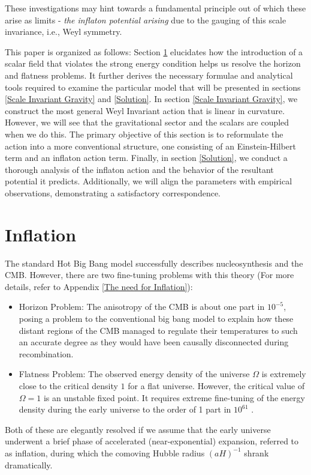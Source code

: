 \documentclass[aps,prd,reprint,preprintnumbers,showpacs,floatfix,nofootinbib,superscript address]{revtex4-2}
\begin{document}
These investigations may hint towards a fundamental principle out of which these arise as limits - \textit{the inflaton potential arising} due to the gauging of this scale invariance, i.e., Weyl symmetry.

This paper is organized as follows: Section \ref{Inflation} elucidates how the introduction of a scalar field that violates the strong energy condition helps us resolve the horizon and flatness problems. It further derives the necessary formulae and analytical tools required to examine the particular model that will be presented in sections \ref{Scale Invariant Gravity} and \ref{Solution}. In section \ref{Scale Invariant Gravity}, we construct the most general Weyl Invariant action that is linear in curvature. However, we will see that the gravitational sector and the scalars are coupled when we do this. The primary objective of this section is to reformulate the action into a more conventional structure, one consisting of an Einstein-Hilbert term and an inflaton action term. Finally, in section \ref{Solution}, we conduct a thorough analysis of the inflaton action and the behavior of the resultant potential it predicts. Additionally, we will align the parameters with empirical observations, demonstrating a satisfactory correspondence.

\section{Inflation}\label{Inflation}
The standard Hot Big Bang model successfully describes nucleosynthesis and the CMB. However, there are two fine-tuning problems with this theory (For more details, refer to Appendix \ref{The need for Inflation}): 
\begin{itemize}
    \item Horizon Problem: The anisotropy of the CMB is about one part in $10^{-5}$, posing a problem to the conventional big bang model to explain how these distant regions of the CMB managed to regulate their temperatures to such an accurate degree as they would have been causally disconnected during recombination.
    \item Flatness Problem: The observed energy density of the universe $\Omega$ is extremely close to the critical density $1$ for a flat universe. However, the critical value of $\Omega = 1$ is an unstable fixed point. It requires extreme fine-tuning of the energy density during the early universe to the order of 1 part in $10^{61}$ \cite{baumann2012tasilecturesinflation}.
\end{itemize}
Both of these are elegantly resolved if we assume that the early universe underwent a brief phase of accelerated (near-exponential) expansion, referred to as inflation, during which the comoving Hubble radius $(aH)^{-1}$ shrank dramatically.
\end{document}
